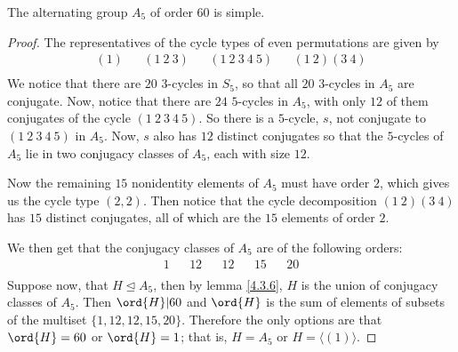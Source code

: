 \begin{theorem}\label{4.3.7}
    The alternating group $A_5$ of order $60$ is simple.
\end{theorem}
\begin{proof}
    The representatives of the cycle types of even permutations are given by
    \begin{align*}
        (1) && (1 \ 2 \ 3) && (1 \ 2 \ 3 \ 4 \ 5) && (1 \ 2)(3 \ 4)     \\
    \end{align*}
    We notice that there are $20$  $3$-cycles in $S_5$, so that all $20$
    $3$-cycles in  $A_5$ are conjugate. Now, notice that there are $24$
    $5$-cycles in $A_5$, with only $12$ of them conjugates of the cycle  $(1 \ 2
    \ 3 \ 4 \ 5)$. So there is a $5$-cycle, $s$, not conjugate to $(1 \ 2 \ 3 \
    4 \ 5)$ in $A_5$. Now, $s$ also has  $12$ distinct conjugates so that the
     $5$-cycles of  $A_5$ lie in two conjugacy classes of  $A_5$, each with size
     $12$.

     Now the remaining $15$ nonidentity elements of  $A_5$ must have order $2$,
     which gives us the cycle type  $(2,2)$. Then notice that the cycle
     decomposition $(1 \ 2)(3 \ 4)$ has $15$ distinct conjugates, all of which
     are the  $15$ elements of order  $2$.

     We then get that the conjugacy classes of  $A_5$ are of the following
     orders:
     \begin{align*}
         1  &&  12  &&  12  &&  15  &&  20  \\
     \end{align*}
     Suppose now, that $H \unlhd A_5$, then by lemma \ref{4.3.6}, $H$ is the
     union of conjugacy classes of  $A_5$. Then $\ord{H}|60$ and $\ord{H}$ is
     the sum of elements of subsets of the multiset $\{1, 12, 12, 15, 20\}$.
     Therefore the only options are that $\ord{H}=60$ or $\ord{H}=1$; that is,
     $H=A_5$ or $H=\langle (1) \rangle$.
\end{proof}
